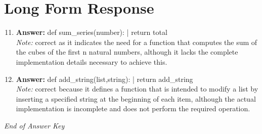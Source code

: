 \documentclass[12pt]{article}
\begin{document}
\section*{Long Form Response}
\begin{enumerate}[label=\arabic*.]
\setcounter{enumi}{10}
\item \textbf{Answer:} def sum\_series(number): | return total
\\ \textit{Note:} correct as it indicates the need for a function that computes the sum of the cubes of the first n natural numbers, although it lacks the complete implementation details necessary to achieve this.
\item \textbf{Answer:} def add\_string(list,string): | return add\_string
\\ \textit{Note:} correct because it defines a function that is intended to modify a list by inserting a specified string at the beginning of each item, although the actual implementation is incomplete and does not perform the required operation.
\end{enumerate}

\vfill
\noindent\textit{End of Answer Key}
\end{document}
